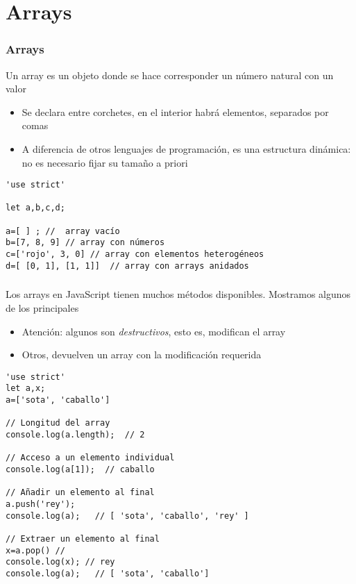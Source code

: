 \documentclass[ucs]{beamer}
\begin{document}
\section{Arrays}
\begin{frame}[fragile]
\frametitle{Arrays}
Un array es un objeto donde se hace corresponder un número natural con
un valor
    \begin{itemize}
    \item
Se declara entre corchetes, en el interior habrá elementos, separados por comas

    \item
A diferencia de otros lenguajes de programación, es una estructura dinámica: no
es necesario fijar su tamaño a priori
    \end{itemize}

  \begin{scriptsize}
  \begin{verbatim}
'use strict'

let a,b,c,d;

a=[ ] ; //  array vacío
b=[7, 8, 9] // array con números
c=['rojo', 3, 0] // array con elementos heterogéneos
d=[ [0, 1], [1, 1]]  // array con arrays anidados
  \end{verbatim}
  \end{scriptsize}

\end{frame}


\begin{frame}[fragile]
\frametitle{}
Los arrays en JavaScript tienen muchos métodos disponibles. Mostramos algunos
de los principales
\begin{itemize}
\item
Atención: algunos son
\emph{destructivos}, esto es, modifican el array

\item
Otros, devuelven un array con la modificación requerida
\end{itemize}


  \begin{scriptsize}
  \begin{verbatim}
'use strict'
let a,x;
a=['sota', 'caballo']

// Longitud del array
console.log(a.length);  // 2

// Acceso a un elemento individual
console.log(a[1]);  // caballo

// Añadir un elemento al final
a.push('rey');
console.log(a);   // [ 'sota', 'caballo', 'rey' ]

// Extraer un elemento al final
x=a.pop() //
console.log(x); // rey
console.log(a);   // [ 'sota', 'caballo']
  \end{verbatim}
  \end{scriptsize}

\end{frame}
\end{document}
